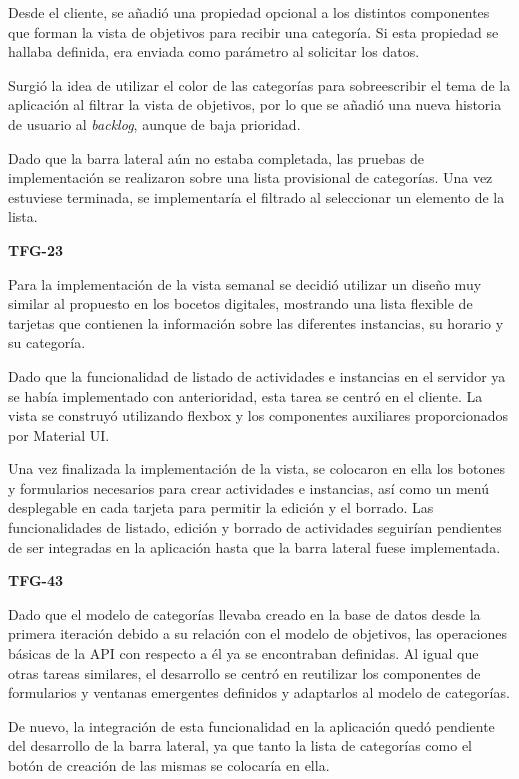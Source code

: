 \documentclass[10pt, a4paper]{aqademic}
\begin{document}
Desde el cliente, se añadió una propiedad opcional a los distintos componentes que forman la vista de objetivos para recibir una categoría. Si esta propiedad se hallaba definida, era enviada como parámetro al solicitar los datos. 

Surgió la idea de utilizar el color de las categorías para sobreescribir el tema de la aplicación al filtrar la vista de objetivos, por lo que se añadió una nueva historia de usuario al \textit{backlog}, aunque de baja prioridad.

Dado que la barra lateral aún no estaba completada, las pruebas de implementación se realizaron sobre una lista provisional de categorías. Una vez estuviese terminada, se implementaría el filtrado al seleccionar un elemento de la lista.

\medskip

\textbf{TFG-23}

Para la implementación de la vista semanal se decidió utilizar un diseño muy similar al propuesto en los bocetos digitales, mostrando una lista flexible de tarjetas que contienen la información sobre las diferentes instancias, su horario y su categoría. 

Dado que la funcionalidad de listado de actividades e instancias en el servidor ya se había implementado con anterioridad, esta tarea se centró en el cliente. La vista se construyó utilizando flexbox \cite{noauthor_flexbox_nodate} y los componentes auxiliares proporcionados por Material UI.

Una vez finalizada la implementación de la vista, se colocaron en ella los botones y formularios necesarios para crear actividades e instancias, así como un menú desplegable en cada tarjeta para permitir la edición y el borrado. Las funcionalidades de listado, edición y borrado de actividades seguirían pendientes de ser integradas en la aplicación hasta que la barra lateral fuese implementada.

\medskip

\textbf{TFG-43}

Dado que el modelo de categorías llevaba creado en la base de datos desde la primera iteración debido a su relación con el modelo de objetivos, las operaciones básicas de la API con respecto a él ya se encontraban definidas. Al igual que otras tareas similares, el desarrollo se centró en reutilizar los componentes de formularios y ventanas emergentes definidos y adaptarlos al modelo de categorías. 

De nuevo, la integración de esta funcionalidad en la aplicación quedó pendiente del desarrollo de la barra lateral, ya que tanto la lista de categorías como el botón de creación de las mismas se colocaría en ella. 
\end{document}
